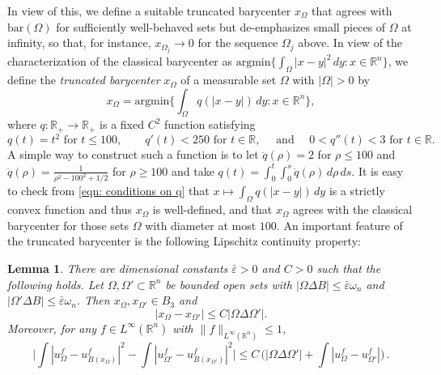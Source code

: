 \documentclass[10pt, reqno]{amsart}
\numberwithin{equation}{section}
\newtheorem{lemma}[theorem]{Lemma}
\def\R{{\mathbb R}}
\def\e{\varepsilon}
\def\w{\omega}
\def\W{\Omega}
\def\baryEps{\bar{\e}}
\def\TBF{q}
\begin{document}
In view of this, we define a suitable {truncated barycenter} $x_\W$ that agrees with $\text{bar}(\W)$ for sufficiently well-behaved sets but de-emphasizes small pieces of $\W$ at infinity, so that, for instance, $x_{\Omega_j} \to 0$ for the sequence $\W_{j}$ above. In view of the characterization  of the classical barycenter as $ \text{argmin}\{ \int_\Omega |x-y|^2 \,dy : x \in \R^n\}$, we define the {\it truncated barycenter} $x_\W$ of a measurable set $\W$ with $|\W|>0$ by 
\begin{equation}
	\label{eqn: barycenter definition}
x_\W = \text{argmin}\Big\{ \int_\W \TBF(|x-y|)\,dy : x \in\R^n \Big\},
\end{equation}
where  $\TBF: \R_+\to \R_+$ is a fixed $C^2$ function satisfying 
\begin{equation}
    \label{eqn: conditions on q}
\TBF(t) = t^2\text{ for }t\leq 100, 
\qquad \TBF'(t)<250 \text{ for }t\in \R, \quad \text{ and } \quad  0 < \TBF'' (t)<3 \text{ for }t\in \R.
\end{equation}
A simple way to construct such a function is to let $\ddot{q}(\rho)=2$ for $\rho\leq 100$ and $\ddot{q}(\rho) =\tfrac{1}{\rho^2 -100^2+1/2}$ for $\rho \geq 100$ and take $q(t) = \int_0^t\int_0^s \ddot{q}(\rho)\,d\rho\,ds$.  
It is easy to check from \eqref{eqn: conditions on q} that $x\mapsto \int_\W \TBF(|x-y|)\,dy$ is a strictly convex function and thus $x_\W$ is well-defined, and that $x_\W$ agrees with the classical barycenter for those sets $\W$ with diameter at most $100$.
An important feature of the truncated barycenter is the following Lipschitz continuity property:
 \begin{lemma}\label{lem: lip bary}
  There are dimensional constants $\baryEps >0$ and $C>0$ such that the following holds. Let $\W, \W'\subset \R^n$ be bounded open sets with $|\W \Delta B| \leq \baryEps \omega_n$ and $|\W' \Delta B| \leq \baryEps \w_n$.  Then $x_\W, x_{\W'} \in B_3$ and  
  \begin{equation}
      \label{eqn: bary lip}
  |x_\W -x_{\W'}|\leq C |\W\Delta \W'|.
   \end{equation}
  Moreover, for any $f \in L^\infty(\R^n)$  with $\|f\|_{L^\infty(\R^n)} \leq1$,
\begin{equation}\label{eqn: beta lip}
\Big| \int   |u_\W^f - u_{B(x_\W)}^f|^2 -  \int  |u_{\W'}^f-u_{B(x_{\W'})}^f|^2   \Big| \leq C\,\Big( |\W\Delta \W'| +\int |u_{\W}^f - u_{\W'}^f|\Big)\,. 
\end{equation}

\end{lemma}
\end{document}
